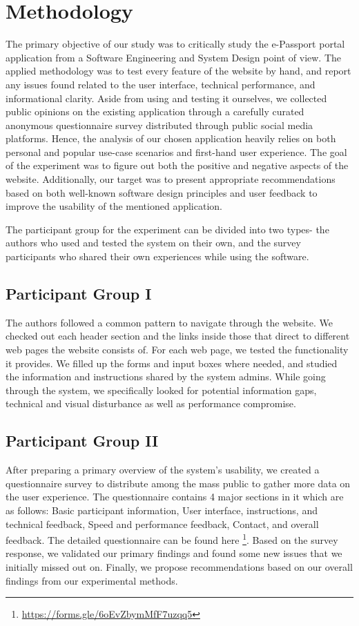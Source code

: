 \section{Methodology}\label{sec:method}

The primary objective of our study was to critically study the e-Passport portal application from a Software Engineering and System Design point of view. The applied methodology was to test every feature of the website by hand, and report any issues found related to the user interface, technical performance, and informational clarity. Aside from using and testing it ourselves, we collected public opinions on the existing application through a carefully curated anonymous questionnaire survey distributed through public social media platforms. Hence, the analysis of our chosen application heavily relies on both personal and popular use-case scenarios and first-hand user experience. The goal of the experiment was to figure out both the positive and negative aspects of the website. Additionally, our target was to present appropriate recommendations based on both well-known software design principles and user feedback to improve the usability of the mentioned application. 

The participant group for the experiment can be divided into two types- the authors who used and tested the system on their own, and the survey participants who shared their own experiences while using the software. 

\subsection{Participant Group I}

The authors followed a common pattern to navigate through the website. We checked out each header section and the links inside those that direct to different web pages the website consists of. For each web page, we tested the functionality it provides. We filled up the forms and input boxes where needed, and studied the information and instructions shared by the system admins. While going through the system, we specifically looked for potential information gaps, technical and visual disturbance as well as performance compromise.

\subsection{Participant Group II}

After preparing a primary overview of the system's usability, we created a questionnaire survey to distribute among the mass public to gather more data on the user experience. The questionnaire contains 4 major sections in it which are as follows: Basic participant information, User interface, instructions, and technical feedback, Speed and performance feedback, Contact, and overall feedback. The detailed questionnaire can be found here \footnote{\url{https://forms.gle/6oEvZbymMfF7uzqq5}}. Based on the survey response, we validated our primary findings and found some new issues that we initially missed out on. Finally, we propose recommendations based on our overall findings from our experimental methods.